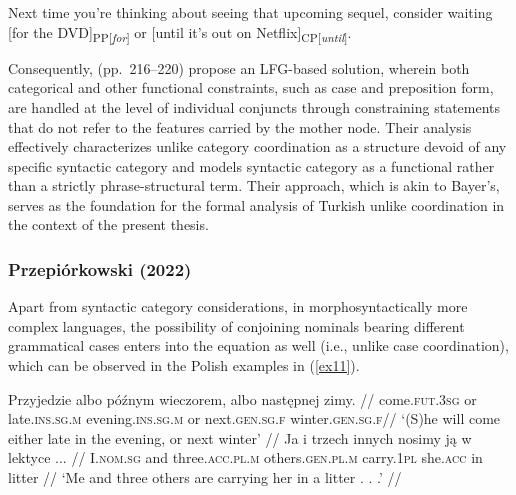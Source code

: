 \pex[glspace=!1em,everygla={},everyglb={},aboveglbskip=-.15ex, interpartskip=15pt]
\label{ex10}
Next time you’re thinking about seeing that upcoming sequel, consider
waiting [for the DVD]\textsubscript{PP[\textit{for}]} or [until it’s out on Netflix]\textsubscript{CP[\textit{until}]}. 
\xe

\begin{sloppypar}
Consequently, \citeauthor{prz:pat:21:oup} (pp.\ 216--220) propose an LFG-based solution, wherein both categorical and other functional constraints, such as case and preposition form, are handled at the level of individual conjuncts through constraining statements that do not refer to the features carried by the mother node. Their analysis effectively characterizes unlike category coordination as a structure devoid of any specific syntactic category and models syntactic category as a functional rather than a strictly phrase-structural term. Their approach, which is akin to Bayer's, serves as the foundation for the formal analysis of Turkish unlike coordination in the context of the present thesis.
\end{sloppypar}

\subsubsection{Przepiórkowski (2022)}

\begin{sloppypar}
Apart from syntactic category considerations, in morphosyntactically more complex languages, the possibility of conjoining nominals bearing different grammatical cases enters into the equation as well (i.e., unlike case coordination), which can be observed in the Polish examples in (\ref{ex11}). 
\end{sloppypar}

\pex[glspace=!1em,everygla={},everyglb={},aboveglbskip=-.15ex, interpartskip=15pt]
\label{ex11}
\a \label{ex11a}
\begingl
\gla Przyjedzie albo p\'{o}\'{z}nym wieczorem, albo nast\k{e}pnej zimy.  //
\glb come.\textsc{fut}.\textsc{3sg} or late.\textsc{ins}.\textsc{sg}.\textsc{m} evening.\textsc{ins}.\textsc{sg}.\textsc{m} or next.\textsc{gen}.\textsc{sg}.\textsc{f} winter.\textsc{gen}.\textsc{sg}.\textsc{f}//
\glft `(S)he will come either late in the evening, or next winter'  //
\endgl
\a \label{ex11b}
\begingl
\gla Ja i trzech innych nosimy j\k{a} w lektyce  ...  //
\glb I.\textsc{nom}.\textsc{sg} and three.\textsc{acc}.\textsc{pl}.\textsc{m} others.\textsc{gen}.\textsc{pl}.\textsc{m} carry.\textsc{1pl} she.\textsc{acc} in litter {}{}{}//
\glft `Me and three others are carrying her in a litter  . . .'  //
\endgl
\xe

